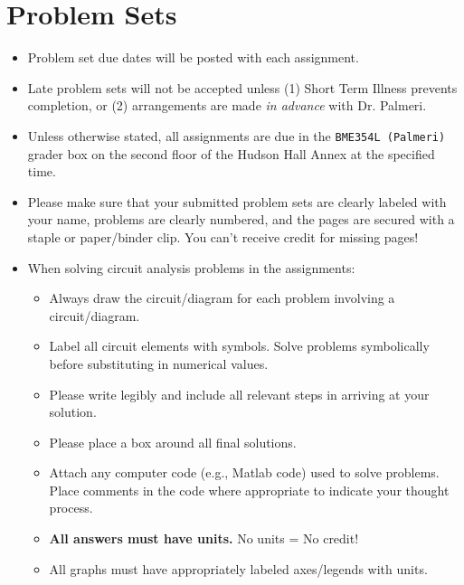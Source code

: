 \section{Problem Sets}
\begin{itemize}
    \item Problem set due dates will be posted with each assignment.  
    \item Late problem sets will not be accepted unless (1) Short Term Illness
        prevents completion, or (2) arrangements are made \emph{in advance}
        with Dr. Palmeri.
    \item Unless otherwise stated, all assignments are due in the \verb+BME354L (Palmeri)+ 
        grader box on the second floor of the Hudson Hall Annex at the
        specified time.  
    \item Please make sure that your submitted problem sets are clearly labeled
        with your name, problems are clearly numbered, and the pages are
        secured with a staple or paper/binder clip.  You can't receive credit
        for missing pages!
    \item When solving circuit analysis problems in the assignments:
        \begin{itemize}
            \item Always draw the circuit/diagram for each problem involving a
                circuit/diagram.
            \item Label all circuit elements with symbols.  Solve problems
                symbolically before substituting in numerical values.
            \item Please write legibly and include all relevant steps in
                arriving at your solution.
            \item Please place a box around all final solutions.
            \item Attach any computer code (e.g., Matlab code) used to solve
                problems.  Place comments in the code where appropriate to
                indicate your thought process.
            \item \textbf{All answers must have units.}  No units = No credit!
            \item All graphs must have appropriately labeled axes/legends with
                units.
        \end{itemize}
\end{itemize}
